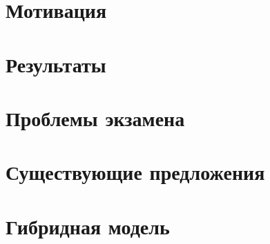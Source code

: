 \documentclass[12pt]{scrartcl}
\begin{document}
\section{Мотивация}\label{sec:motivation}

\section{Результаты}\label{sec:results}

\section{Проблемы экзамена}

\section{Существующие предложения}

\section{Гибридная модель}\label{sec:hybrid_mpdel}





\printbibliography
\end{document}
